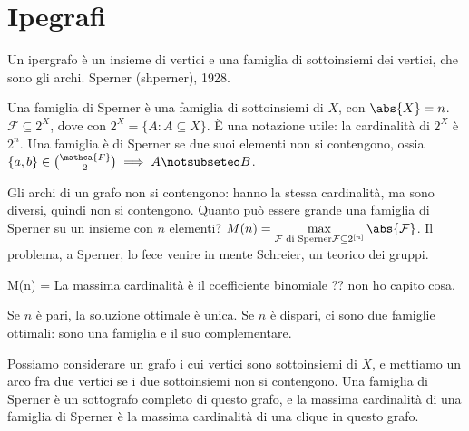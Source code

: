 \section{Ipegrafi}

Un ipergrafo \`e un insieme di vertici e una famiglia di sottoinsiemi dei vertici, che sono gli archi.
Sperner (shperner), 1928.

Una famiglia di Sperner \`e una famiglia di sottoinsiemi di $X$, con $\abs{X} = n$.
$\mathcal{F} \subseteq 2^X$, dove con $2^X = \{ A : A \subseteq X \}$.
\`E una notazione utile: la cardinalit\`a di $2^X$ \`e $2^n$.
Una famiglia \`e di Sperner se due suoi elementi non si contengono, ossia $\{a,b\} \in \binom{\mathca{F}}{2} \implies A \notsubseteq B$.

Gli archi di un grafo non si contengono: hanno la stessa cardinalit\`a, ma sono diversi, quindi non si contengono.
Quanto pu\`o essere grande una famiglia di Sperner su un insieme con $n$ elementi?
$M(n) = \max\limits_{\mathcal{F} \text{ di Sperner} \\ \mathcal{F} \subseteq 2^{[n]}} \abs{\mathcal{F}}$.
Il problema, a Sperner, lo fece venire in mente Schreier, un teorico dei gruppi.

\begin{theorem}[di Sperner (1928)]
	M(n) = 
	La massima cardinalit\`a \`e il coefficiente binomiale ?? non ho capito cosa.

	Se $n$ \`e pari, la soluzione ottimale \`e unica.
	Se $n$ \`e dispari, ci sono due famiglie ottimali: sono una famiglia e il suo complementare.
\end{theorem}

Possiamo considerare un grafo i cui vertici sono sottoinsiemi di $X$, e mettiamo un arco fra due vertici se i due sottoinsiemi non si contengono.
Una famiglia di Sperner \`e un sottografo completo di questo grafo, e la massima cardinalit\`a di una famiglia di Sperner \`e la massima cardinalit\`a di una clique in questo grafo.

